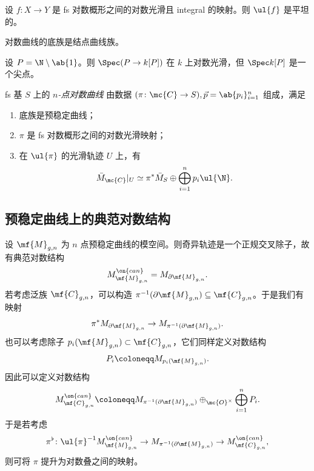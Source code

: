 \begin{prop}
    设 \(f \colon X \to Y\) 是 fs 对数概形之间的对数光滑且 integral 的映射。则 \(\ul{f}\) 是平坦的。
\end{prop}

\begin{thm}
    对数曲线的底族是结点曲线族。
\end{thm}

\begin{exm}
    设 \(P = \N \setminus \ab\{1\}\)。则 \(\Spec (P \to k[P])\) 在 \(k\) 上对数光滑，但 \(\Spec k[P]\) 是一个尖点。
\end{exm}

\begin{defn}
    fs 基 \(S\) 上的 \textit{\(n\)-点对数曲线} 由数据 \((\pi \colon \mc{C} \to S), \vec{p} = \ab\{p_i\}_{i=1}^n\) 组成，满足
    \begin{enumerate}
        \item 底族是预稳定曲线；
        \item \(\pi\) 是 fs 对数概形之间的对数光滑映射；
        \item 在 \(\ul{\pi}\) 的光滑轨迹 \(U\) 上，有
            \[ \bar{M}_{\mc{C}}|_U \simeq \pi^* \bar{M}_S \oplus \bigoplus_{i=1}^n p_i \ul{\N}. \]
    \end{enumerate}
\end{defn}

\subsection{预稳定曲线上的典范对数结构}%
\label{sub:Canonical log structures on prestable curves}

设 \(\mf{M}_{g,n}\) 为 \(n\) 点预稳定曲线的模空间。则奇异轨迹是一个正规交叉除子，故有典范对数结构
\[ M_{\mf{M}_{g,n}}^{\on{can}} = M_{\partial \mf{M}_{g,n}}. \]
若考虑泛族 \(\mf{C}_{g,n}\)，可以构造 \(\pi^{-1}(\partial \mf{M}_{g,n}) \subseteq \mf{C}_{g,n}\)。于是我们有映射
\[ \pi^* M_{\partial \mf{M}_{g,n}} \to M_{\pi^{-1}(\partial \mf{M}_{g,n})}. \]
也可以考虑除子 \(p_i(\mf{M}_{g,n}) \subset \mf{C}_{g,n}\)，它们同样定义对数结构
\[ P_i \coloneqq M_{p_i(\mf{M}_{g,n})}. \]
因此可以定义对数结构
\[ M_{\mf{C}_{g,n}}^{\on{can}} \coloneqq M_{\pi^{-1}(\partial\mf{M}_{g,n})} \oplus_{\mc{O}^{\times}} \bigoplus_{i=1}^n P_i. \]
于是若考虑
\[ \pi^{\flat} \colon \ul{\pi}^{-1} M_{\mf{M}_{g,n}}^{\on{can}} \to M_{\pi^{-1}(\partial \mf{M}_{g,n})} \to M_{\mf{C}_{g,n}}^{\on{can}}, \]
则可将 \(\pi\) 提升为对数叠之间的映射。

